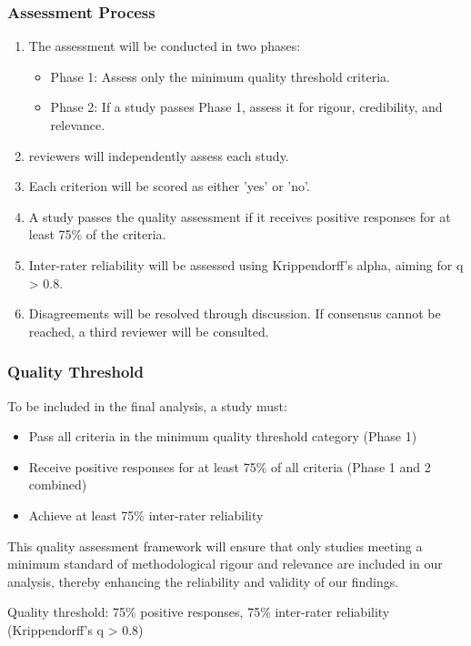 \documentclass[a4paper,12pt]{article}
\begin{document}
\subsubsection{Assessment Process}
\begin{enumerate}
    \item The assessment will be conducted in two phases:
    \begin{itemize}
        \item Phase 1: Assess only the minimum quality threshold criteria.
        \item Phase 2: If a study passes Phase 1, assess it for rigour, credibility, and relevance.
    \end{itemize}
    \item reviewers will independently assess each study.
    \item Each criterion will be scored as either 'yes' or 'no'.
    \item A study passes the quality assessment if it receives positive responses for at least 75\% of the criteria.
    \item Inter-rater reliability will be assessed using Krippendorff's alpha, aiming for q > 0.8.
    \item Disagreements will be resolved through discussion. If consensus cannot be reached, a third reviewer will be consulted.
\end{enumerate}

\subsubsection{Quality Threshold}
To be included in the final analysis, a study must:
\begin{itemize}
    \item Pass all criteria in the minimum quality threshold category (Phase 1)
    \item Receive positive responses for at least 75\% of all criteria (Phase 1 and 2 combined)
    \item Achieve at least 75\% inter-rater reliability
\end{itemize}

This quality assessment framework will ensure that only studies meeting a minimum standard of methodological rigour and relevance are included in our analysis, thereby enhancing the reliability and validity of our findings.

Quality threshold: 75\% positive responses, 75\% inter-rater reliability (Krippendorff's q > 0.8)
\end{document}
